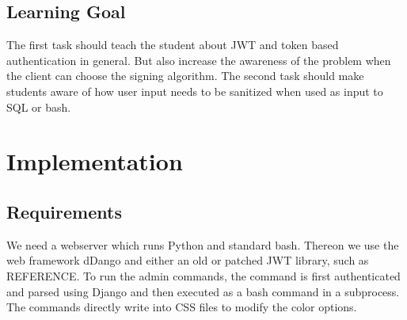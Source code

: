 \documentclass[12pt,a4paper]{article}
\begin{document}
\subsection{Learning Goal}

The first task should teach the student about JWT and token based authentication in general. But also increase the awareness of the problem when the client can choose the signing algorithm. %
The second task should make students aware of how user input needs to be sanitized when used as input to SQL or bash. %

\section{Implementation}
\subsection{Requirements}

We need a webserver which runs Python and standard bash. Thereon we use the web framework dDango and either an old or patched JWT library, such as REFERENCE. To run the admin commands, the command is first authenticated and parsed using Django and then executed as a bash command in a subprocess. The commands directly write into CSS files to modify the color options.
\end{document}
